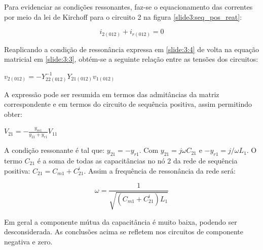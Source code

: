 Para evidenciar as condições ressonantes, faz-se o equacionamento das correntes por meio da lei de Kirchoff para o circuito 2 na figura \ref{slide3:seq_pos_reat}:

\begin{equation} \label{slide:3:4}
    i_{2(012)} + i_{r(012)} = 0
\end{equation}

Reaplicando a condição de ressonância expressa em \ref{slide:3:4} de volta na equação matricial em \ref{slide:3:3}, obtém-se a seguinte relação entre as tensões dos circuitos:

\begin{center} 
    $v_{2(012)} = -Y_{22(012)}^{-1} Y_{21(012)} v_{1(012)}$
\end{center}

A expressão pode ser resumida em termos das admitâncias da matriz correspondente e em termos do circuito de sequência positiva, assim permitindo obter:

\begin{center}
    $V_{21} = -\frac{y_{m1}}{y_{21}+y_{r1}}V_{11}$
\end{center}

A condição ressonante é tal que: $y_{21}=-y_{r1}$. Com $y_{21} = j\omega C_{21}$ e $-y_{r1} = j/\omega L_1$. O termo $C_{21}$ é a soma de todas as capacitâncias no nó 2 da rede de sequência positiva: $C_{21} = C_{m1} + C_{21}^{i}$. Assim a frequência de ressonância da rede será:

\begin{equation} \label{slide:3:5}
    \omega = \frac{1}{\sqrt{(C_{m1} + C_{21}^{i})L_1}}
\end{equation}
    
Em geral a componente mútua da capacitância é muito baixa, podendo ser desconsiderada. As conclusões acima se refletem nos circuitos de componente negativa e zero.

